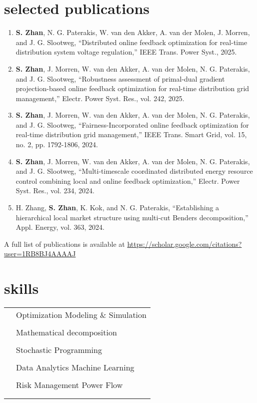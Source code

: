 \documentclass[12pt]{article}
\newcommand{\tableentry}[3]{\textsc{#1} & #2\expandafter\ifstrequal\expandafter{#3}{}{\\}{\\[6pt]}}
\begin{document}
\begin{paracol}{2}
\section{selected publications}
\begin{enumerate}
    \item \textbf{S. Zhan}, N. G. Paterakis, W. van den Akker, A. van der Molen, J. Morren, and J. G. Slootweg, “Distributed online feedback optimization for real-time distribution system voltage regulation,” IEEE Trans. Power Syst., 2025.
    \item \textbf{S. Zhan}, J. Morren, W. van den Akker, A. van der Molen, N. G. Paterakis, and J. G. Slootweg, “Robustness assessment of primal-dual gradient projection-based online feedback optimization for real-time distribution grid management,” Electr. Power Syst. Res., vol. 242,  2025.
    \item \textbf{S. Zhan}, J. Morren, W. van den Akker, A. van der Molen, N. G. Paterakis, and J. G. Slootweg, “Fairness-Incorporated online feedback optimization for real-time distribution grid management,” IEEE Trans. Smart Grid, vol. 15, no. 2, pp. 1792-1806, 2024.
      \item \textbf{S. Zhan}, J. Morren, W. van den Akker, A. van der Molen, N. G. Paterakis, and J. G. Slootweg, “Multi-timescale coordinated distributed energy resource control combining local and online feedback optimization,” Electr. Power Syst. Res., vol. 234, 2024.
      \item H. Zhang, \textbf{S. Zhan}, K. Kok, and N. G. Paterakis, “Establishing a hierarchical local market structure using multi-cut Benders decomposition,” Appl. Energy, vol. 363, 2024.
\end{enumerate}

\raggedright
A full list of publications is available at \href{https://scholar.google.com/citations?user=1RB8BJ4AAAAJ}{https://scholar.google.com/citations?user=1RB8BJ4AAAAJ} 

\switchcolumn

\section{skills}
\begin{supertabular}{rl}
    \tableentry{\footnotesize\faKeyboard}{Optimization \textperiodcentered{} Modeling \& Simulation }{}
        \tableentry{}{Mathematical decomposition}{}
      \tableentry{}{ Stochastic Programming }{}
      \tableentry{}{Data Analytics \textperiodcentered{}  Machine Learning}{}
      \tableentry{}{ Risk Management \textperiodcentered{} Power Flow}{} 
        

\end{supertabular}
\end{paracol}
\end{document}
